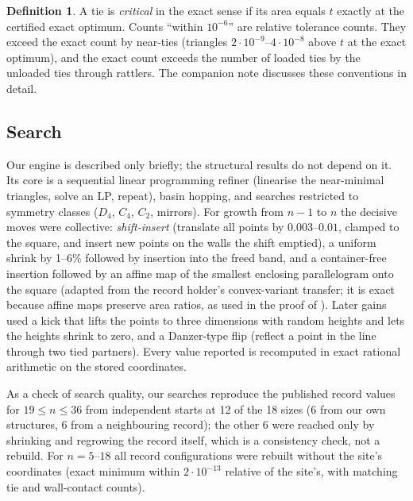 \documentclass[11pt]{amsart}
\theoremstyle{definition}
\newtheorem{definition}[theorem]{Definition}
\begin{document}
\begin{definition}
A tie is \emph{critical} in the exact sense if its area equals $t$ exactly at the certified exact optimum. Counts ``within $10^{-6}$'' are relative tolerance counts. They exceed the exact count by near-ties (triangles $2\cdot10^{-9}$--$4\cdot10^{-8}$ above $t$ at the exact optimum), and the exact count exceeds the number of loaded ties by the unloaded ties through rattlers. The companion note \cite{Note2} discusses these conventions in detail. %
\end{definition}

\subsection{Search}\label{sec:search}
Our engine is described only briefly; the structural results do not depend on it. Its core is a sequential linear programming refiner (linearise the near-minimal triangles, solve an LP, repeat), basin hopping, and searches restricted to symmetry classes ($D_4$, $C_4$, $C_2$, mirrors). For growth from $n-1$ to $n$ the decisive moves were collective: \emph{shift-insert} (translate all points by $0.003$--$0.01$, clamped to the square, and insert new points on the walls the shift emptied), a uniform shrink by 1--6\% followed by insertion into the freed band, and a container-free insertion followed by an affine map of the smallest enclosing parallelogram onto the square (adapted from the record holder's convex-variant transfer; it is exact because affine maps preserve area ratios, as used in the proof of \cite[Lemma~1]{SM}). %
Later gains used a kick that lifts the points to three dimensions with random heights and lets the heights shrink to zero, and a Danzer-type flip (reflect a point in the line through two tied partners). %
Every value reported is recomputed in exact rational arithmetic on the stored coordinates.

As a check of search quality, our searches reproduce the published record values for $19 \le n \le 36$ from independent starts at 12 of the 18 sizes (6 from our own structures, 6 from a neighbouring record); the other 6 were reached only by shrinking and regrowing the record itself, which is a consistency check, not a rebuild. %
For $n = 5$--$18$ all record configurations were rebuilt without the site's coordinates (exact minimum within $2\cdot10^{-13}$ relative of the site's, with matching tie and wall-contact counts). %
\end{document}

